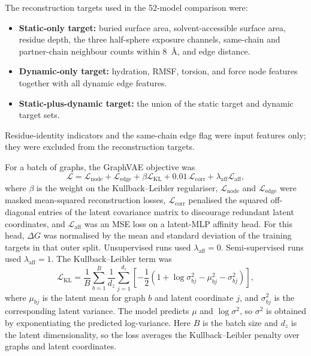 The reconstruction targets used in the 52-model comparison were:

\begin{itemize}
\item \textbf{Static-only target:} buried surface area, solvent-accessible surface area, residue depth, the three half-sphere exposure channels, same-chain and partner-chain neighbour counts within 8~\AA, and edge distance.
\item \textbf{Dynamic-only target:} hydration, RMSF, torsion, and force node features together with all dynamic edge features.
\item \textbf{Static-plus-dynamic target:} the union of the static target and dynamic target sets.
\end{itemize}

Residue-identity indicators and the same-chain edge flag were input features only; they were excluded from the reconstruction targets.

For a batch of graphs, the GraphVAE objective was
\begin{equation}
\mathcal{L} = \mathcal{L}_{\mathrm{node}} + \mathcal{L}_{\mathrm{edge}} + \beta \mathcal{L}_{\mathrm{KL}} + 0.01\,\mathcal{L}_{\mathrm{corr}} + \lambda_{\mathrm{aff}}\mathcal{L}_{\mathrm{aff}},
\end{equation}
where $\beta$ is the weight on the Kullback--Leibler regulariser, $\mathcal{L}_{\mathrm{node}}$ and $\mathcal{L}_{\mathrm{edge}}$ were masked mean-squared reconstruction losses, $\mathcal{L}_{\mathrm{corr}}$ penalised the squared off-diagonal entries of the latent covariance matrix to discourage redundant latent coordinates, and $\mathcal{L}_{\mathrm{aff}}$ was an MSE loss on a latent-MLP affinity head. For this head, $\Delta G$ was normalised by the mean and standard deviation of the training targets in that outer split. Unsupervised runs used $\lambda_{\mathrm{aff}}=0$. Semi-supervised runs used $\lambda_{\mathrm{aff}}=1$. The Kullback--Leibler term was
\begin{equation}
\mathcal{L}_{\mathrm{KL}} = \frac{1}{B}\sum_{b=1}^{B}\frac{1}{d_z}\sum_{j=1}^{d_z}
\left[-\frac{1}{2}\left(1 + \log \sigma_{bj}^{2} - \mu_{bj}^{2} - \sigma_{bj}^{2}\right)\right],
\end{equation}
where $\mu_{bj}$ is the latent mean for graph $b$ and latent coordinate $j$, and $\sigma_{bj}^{2}$ is the corresponding latent variance. The model predicts $\mu$ and $\log \sigma^{2}$, so $\sigma^{2}$ is obtained by exponentiating the predicted log-variance. Here $B$ is the batch size and $d_z$ is the latent dimensionality, so the loss averages the Kullback--Leibler penalty over graphs and latent coordinates.

